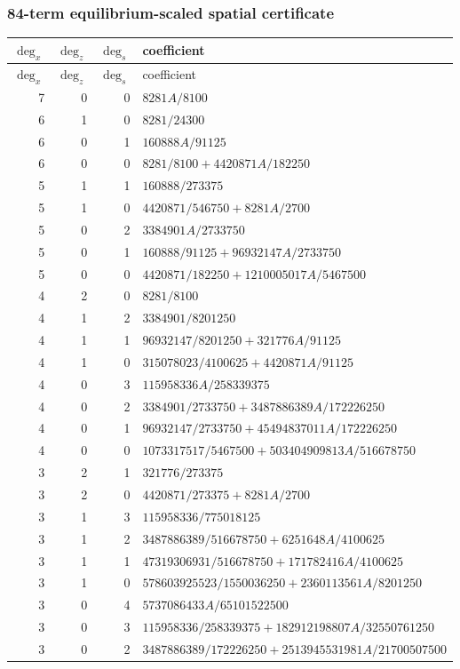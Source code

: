\subsubsection*{84-term equilibrium-scaled spatial certificate}
\begin{longtable}{rrrl}
$\deg_{x}$ & $\deg_{z}$ & $\deg_{s}$ & coefficient\\
\toprule
\endfirsthead
$\deg_{x}$ & $\deg_{z}$ & $\deg_{s}$ & coefficient\\
\toprule
\endhead
7 & 0 & 0 & $8281A/8100$\\
6 & 1 & 0 & $8281/24300$\\
6 & 0 & 1 & $160888A/91125$\\
6 & 0 & 0 & $8281/8100+4420871A/182250$\\
5 & 1 & 1 & $160888/273375$\\
5 & 1 & 0 & $4420871/546750+8281A/2700$\\
5 & 0 & 2 & $3384901A/2733750$\\
5 & 0 & 1 & $160888/91125+96932147A/2733750$\\
5 & 0 & 0 & $4420871/182250+1210005017A/5467500$\\
4 & 2 & 0 & $8281/8100$\\
4 & 1 & 2 & $3384901/8201250$\\
4 & 1 & 1 & $96932147/8201250+321776A/91125$\\
4 & 1 & 0 & $315078023/4100625+4420871A/91125$\\
4 & 0 & 3 & $115958336A/258339375$\\
4 & 0 & 2 & $3384901/2733750+3487886389A/172226250$\\
4 & 0 & 1 & $96932147/2733750+45494837011A/172226250$\\
4 & 0 & 0 & $1073317517/5467500+503404909813A/516678750$\\
3 & 2 & 1 & $321776/273375$\\
3 & 2 & 0 & $4420871/273375+8281A/2700$\\
3 & 1 & 3 & $115958336/775018125$\\
3 & 1 & 2 & $3487886389/516678750+6251648A/4100625$\\
3 & 1 & 1 & $47319306931/516678750+171782416A/4100625$\\
3 & 1 & 0 & $578603925523/1550036250+2360113561A/8201250$\\
3 & 0 & 4 & $5737086433A/65101522500$\\
3 & 0 & 3 & $115958336/258339375+182912198807A/32550761250$\\
3 & 0 & 2 & $3487886389/172226250+2513945531981A/21700507500$\\

\end{longtable}
